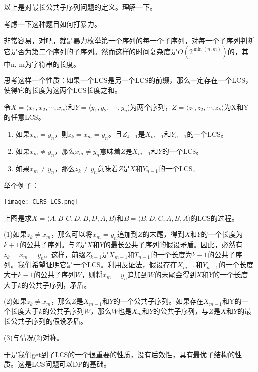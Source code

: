 以上是对最长公共子序列问题的定义。理解一下。

考虑一下这种题目如何打暴力。

非常容易，对吧，就是暴力枚举第一个序列的每一个子序列，对每一个子序列判断它是否为第二个序列的子序列。然而这样的时间复杂度是$O(2^{\min(n,m)})$的，其中n, m为字符串的长度。

思考这样一个性质：如果一个LCS是另一个LCS的前缀，那么一定存在一个LCS，使得它的长度为这两个LCS长度之和。

\begin{thm}[LCS的最优子结构]
	令$X=\langle x_1, x_2, \cdots, x_m\rangle$和$Y=\langle y_1, y_2,$ $\cdots,y_n\rangle$为两个序列，$Z=\langle z_1, z_2, \cdots, z_k\rangle$为X和Y的任意LCS。
	\begin{enumerate}
		\item{如果$x_m=y_n$，则$z_k=x_m=y_n$。且$Z_{k-1}$是$X_{m-1}$和$Y_{n-1}$的一个LCS。}
		\item{如果$x_m\neq y_n$，那么$x_m\neq y_n$意味着$Z$是$X_{m-1}$和$Y$的一个LCS。}
		\item{如果$x_m\neq y_n$，那么$z_k\neq y_n$意味着$Z$是$X$和$Y_{n-1}$的一个LCS。}
	\end{enumerate}
\end{thm}

举个例子：
\begin{center}\texttt{[image: CLRS\_LCS.png]}\end{center}

上图是求$X=\langle A, B, C, D, B, D, A, B\rangle$和$B=\langle B, D, C, A, B, A\rangle$的LCS的过程。

\begin{Proof}
	(1)如果$z_k\neq x_m$，那么可以将$x_m=y_n$追加到$Z$的末尾，得到$X$和$Y$的一个长度为$k+1$的公共子序列。与$Z$是$X$和$Y$的最长公共子序列的假设矛盾。因此，必然有$z_k=x_m=y_n$。这样，前缀$Z_{k-1}$是$X_{m-1}$和$T_{n-1}$的一个长度为$k-1$的公共子序列。我们希望证明它是一个LCS。利用反证法，假设存在$X_{m-1}$和$Y_{n-1}$的一个长度大于$k-1$的公共子序列$W$，则将$x_m=y_n$追加到$W$的末尾会得到$X$和$Y$的一个长度大于$k$的公共子序列，矛盾。

	(2)如果$z_k\neq x_m$，那么$Z$是$X_{m-1}$和$Y$的一个公共子序列。如果存在$X_{m-1}$和Y的一个长度大于$k$的公共子序列$W$，那么$W$也是$X_m$和$Y$的公共子序列，与$Z$是$X$和$Y$的最长公共子序列的假设矛盾。

	(3)与情况(2)对称。\
\end{Proof}

于是我们get到了LCS的一个很重要的性质，没有后效性，具有最优子结构的性质。这是LCS问题可以DP的基础。

